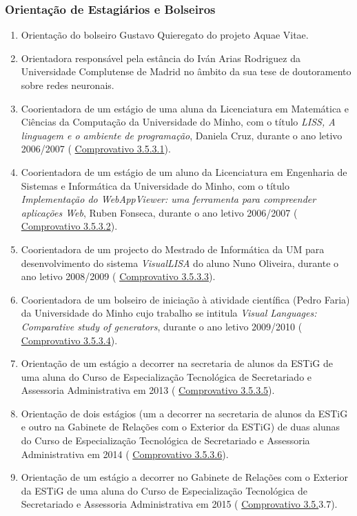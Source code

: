 \documentclass[11pt]{article}
\begin{document}
\subsubsection{Orientação de Estagiários e Bolseiros}
\begin{enumerate}
\item{Orientação do bolseiro Gustavo Quieregato do projeto Aquae Vitae.}
\item{Orientadora responsável pela estância do Iván Arias Rodriguez da Universidade Complutense de Madrid no âmbito da sua tese de doutoramento sobre redes neuronais.}
\item{Coorientadora de um estágio de uma aluna da Licenciatura em Matemática e Ciências da Computação da Universidade do Minho, com o título {
\em{ LISS, A linguagem e o ambiente de programação}}, Daniela Cruz, durante o ano letivo 2006/2007  (
\href{run:Projectos/declaracoesUM.pdf}{Comprovativo 3.5.3.1}).}
\item{Coorientadora de um estágio de um aluno da Licenciatura em Engenharia de Sistemas e Informática da Universidade do Minho, com o título {
\em{ Implementação do WebAppViewer: uma ferramenta para compreender aplicações Web}}, Ruben Fonseca, durante o ano letivo 2006/2007 (
\href{run:Projectos/declaracoesUM.pdf}{Comprovativo 3.5.3.2}).}
\item{Coorientadora de um projecto do Mestrado de Informática da UM para desenvolvimento do sistema {
\em{ VisualLISA}} do aluno Nuno Oliveira, durante o ano letivo 2008/2009 (
\href{run:Projectos/declaracoesUM.pdf}{Comprovativo 3.5.3.3}).}
\item{Coorientadora de um bolseiro de iniciação à atividade científica (Pedro Faria) da Universidade do Minho cujo trabalho se intitula {
\em{ Visual Languages: Comparative study of generators}}, durante o ano letivo 2009/2010 (
\href{run:Projectos/declaracoesUM.pdf}{Comprovativo 3.5.3.4}).}
\item{Orientação de um estágio a decorrer na secretaria de alunos da ESTiG de uma aluna do Curso de Especialização Tecnológica de Secretariado e Assessoria Administrativa em 2013 (
\href{run:CoOrientTrabalhos/estagiosESE.pdf}{Comprovativo 3.5.3.5}).}
\item{Orientação de dois estágios (um a decorrer na secretaria de alunos da ESTiG e outro na Gabinete de Relações com o Exterior da ESTiG) de duas alunas do Curso de Especialização Tecnológica de Secretariado e Assessoria Administrativa em 2014 (
\href{run:CoOrientTrabalhos/estagiosESE.pdf}{Comprovativo 3.5.3.6}).}
\item{Orientação de um estágio a decorrer no Gabinete de Relações com o Exterior da ESTiG de uma aluna do Curso de Especialização Tecnológica de Secretariado e Assessoria Administrativa em 2015 (
\href{run:CoOrientTrabalhos/estagiosESE.pdf}{Comprovativo 3.5.}3.7).}
\end{enumerate}
\end{document}
